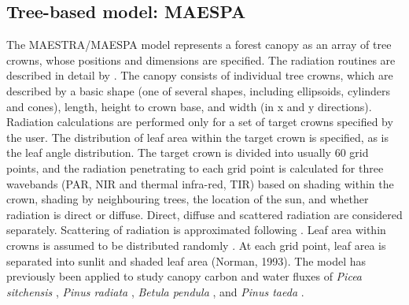 

\subsection{Tree-based model: MAESPA}\label{section:maespa}
The MAESTRA/MAESPA model \citep{Wang1990,Medlyn2004,Medlyn2007,Duursma2012} represents a forest canopy as an array of tree crowns, whose positions and dimensions are specified. The radiation routines are described in detail by \citet{Wang1990}. The canopy consists of individual tree crowns, which are described by a basic shape (one of several shapes, including ellipsoids, cylinders and cones), length, height to crown base, and width (in x and y directions). Radiation calculations are performed only for a set of target crowns specified by the user. The distribution of leaf area within the target crown is specified, as is the leaf angle distribution. The target crown is divided into usually 60 grid points, and the radiation penetrating to each grid point is calculated for three wavebands (PAR, NIR and thermal infra-red, TIR) based on shading within the crown, shading by neighbouring trees, the location of the sun, and whether radiation is direct or diffuse. Direct, diffuse and scattered radiation are considered separately. Scattering of radiation is approximated following \citet{Norman1979}. Leaf area within crowns is assumed to be distributed randomly \citep{Wang1990}. At each grid point, leaf area is separated into sunlit and shaded leaf area (Norman, 1993). The model has previously been applied to study canopy carbon and water fluxes of \textit{Picea sitchensis} \citep{Wang1990}, \textit{Pinus radiata} \citep{McMurtrie1993}, \textit{Betula pendula} \citep{Wang1998}, and \textit{Pinus taeda} \citep{Luo2001}. 

